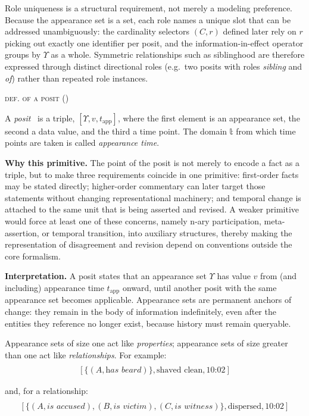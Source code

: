 \documentclass[a4paper,fleqn]{cas-sc}
\newcounter{majorcount}
\newcommand{\deffy}[3]{
	\vspace{2ex}
	\refstepcounter{majorcount}
	\noindent\textsc{#1} {\normalfont(\arabic{majorcount})}
	\\\begin{small}
	\noindent #2%
	\label{Def:#3}
	\end{small}
	\vspace{2ex}
}
\begin{document}
Role uniqueness is a structural requirement, not merely a modeling preference. Because the appearance set is a set, each role names a unique slot that can be addressed unambiguously: the cardinality selectors \((C,r)\) defined later rely on \(r\) picking out exactly one identifier per posit, and the information-in-effect operator groups by \(\Upsilon\) as a whole. Symmetric relationships such as siblinghood are therefore expressed through distinct directional roles (e.g.\ two posits with roles \textit{sibling} and \textit{of}) rather than repeated role instances.

\deffy{def. of a posit}{%
A \emph{posit}~\cite{Oxford} is a triple, \(\left[\Upsilon, v, t_{\mathrm{app}}\right]\), where the first element is an appearance set, the second a data value, and the third a time point. The domain \(\mathbb{t}\) from which time points are taken is called \emph{appearance time}.}{posit}

\textbf{Why this primitive.} The point of the posit is not merely to encode a fact as a triple, but to make three requirements coincide in one primitive: first-order facts may be stated directly; higher-order commentary can later target those statements without changing representational machinery; and temporal change is attached to the same unit that is being asserted and revised. A weaker primitive would force at least one of these concerns, namely n-ary participation, meta-assertion, or temporal transition, into auxiliary structures, thereby making the representation of disagreement and revision depend on conventions outside the core formalism.

\textbf{Interpretation.} A posit states that an appearance set \(\Upsilon\) has value \(v\) from (and including) appearance time \(t_{\mathrm{app}}\) onward, until another posit with the same appearance set becomes applicable. Appearance sets are permanent anchors of change: they remain in the body of information indefinitely, even after the entities they reference no longer exist, because history must remain queryable.

Appearance sets of size one act like \emph{properties}; appearance sets of size greater than one act like \emph{relationships}. For example:
\begin{align*}
[\{(A, \textit{has beard})\}, \textrm{fluffy red}, \textrm{10:00}] \\
[\{(A, \textit{has beard})\}, \textrm{shaved clean}, \textrm{10:02}]
\end{align*}

and, for a relationship:
\begin{align*}
[\{(A, \textit{is accused}), (B, \textit{is victim}), (C, \textit{is witness})\}, \textrm{at scene of crime}, \textrm{09:58}] \\
[\{(A, \textit{is accused}), (B, \textit{is victim}), (C, \textit{is witness})\}, \textrm{dispersed}, \textrm{10:02}]
\end{align*}
\end{document}
